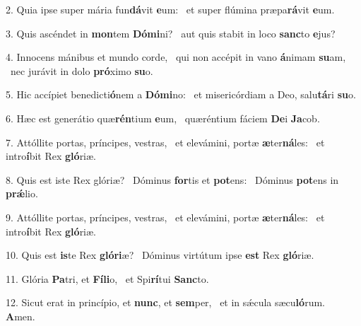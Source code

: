 2. Quia ipse super mária fun\textbf{dá}vit \textbf{e}um: \ast\  et super flúmina præpa\textbf{rá}vit \textbf{e}um.\

3. Quis ascéndet in \textbf{mon}tem \textbf{Dó}\textbf{mi}ni? \ast\  aut quis stabit in loco \textbf{sanc}to \textbf{e}jus?\

4. Innocens mánibus et mundo corde, \dag\  qui non accépit in vano \textbf{á}nimam \textbf{su}am, \ast\  nec jurávit in dolo \textbf{pró}ximo \textbf{su}o.\

5. Hic accípiet benedicti\textbf{ó}nem a \textbf{Dó}\textbf{mi}no: \ast\  et misericórdiam a Deo, salu\textbf{tá}ri \textbf{su}o.\

6. Hæc est generátio quæ\textbf{rén}tium \textbf{e}um, \ast\  quæréntium fáciem \textbf{De}i \textbf{Ja}cob.\

7. Attóllite portas, príncipes, vestras, \dag\  et elevámini, portæ \textbf{æ}ter\textbf{ná}les: \ast\  et intro\textbf{í}bit Rex \textbf{gló}riæ.\

8. Quis est iste Rex glóriæ? \dag\  Dóminus \textbf{for}tis et \textbf{pot}ens: \ast\  Dóminus \textbf{pot}ens in \textbf{prǽ}lio.\

9. Attóllite portas, príncipes, vestras, \dag\  et elevámini, portæ \textbf{æ}ter\textbf{ná}les: \ast\  et intro\textbf{í}bit Rex \textbf{gló}riæ.\

10. Quis est \textbf{is}te Rex \textbf{gló}\textbf{ri}æ? \ast\  Dóminus virtútum ipse \textbf{est} Rex \textbf{gló}riæ.\

11. Glória \textbf{Pa}tri, et \textbf{Fí}\textbf{li}o, \ast\  et Spi\textbf{rí}tui \textbf{Sanc}to.\

12. Sicut erat in princípio, et \textbf{nunc}, et \textbf{sem}per, \ast\  et in sǽcula sæcu\textbf{ló}rum. \textbf{A}men.\

